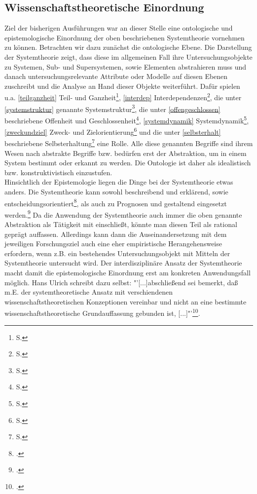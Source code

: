 \documentclass[a4paper,12pt]{article}
\begin{document}
\subsection{Wissenschaftstheoretische Einordnung}\label{einordnung}
Ziel der bisherigen Ausführungen war an dieser Stelle eine ontologische und epistemologische Einordnung der oben beschriebenen Systemtheorie vornehmen zu können. Betrachten wir dazu zunächst die ontologische Ebene. Die Darstellung der Systemtheorie zeigt, dass diese im allgemeinen Fall ihre Untersuchungsobjekte zu Systemen, Sub- und Supersystemen, sowie Elementen abstrahieren muss und danach untersuchungsrelevante Attribute oder Modelle auf diesen Ebenen zuschreibt und die Analyse an Hand dieser Objekte weiterführt. Dafür spielen u.a. \ref{teilganzheit} Teil- und Ganzheit\footnote{S. \pageref{teilganzheit}}, \ref{interdep} Interdependenzen\footnote{S. \pageref{interdep}}, die unter \ref{systemstruktur} genannte Systemstruktur\footnote{S. \pageref{systemstruktur}}, die unter \ref{offengeschlossen} beschriebene Offenheit und Geschlossenheit\footnote{S. \pageref{offengeschlossen}}, \ref{systemdynamik} Systemdynamik\footnote{S. \pageref{systemdynamik}}, \ref{zweckundziel} Zweck- und Zielorientierung\footnote{S. \pageref{zweckundziel}} und die unter \ref{selbsterhalt} beschriebene Selbsterhaltung\footnote{S. \pageref{selbsterhalt}} eine Rolle. Alle diese genannten Begriffe sind ihrem Wesen nach abstrakte Begriffe bzw. bedürfen erst der Abstraktion, um in einem System bestimmt oder erkannt zu werden. Die Ontologie ist daher als idealistisch bzw. konstruktivistisch einzustufen.\\
Hinsichtlich der Epistemologie liegen die Dinge bei der Systemtheorie etwas anders. Die Systemtheorie kann sowohl beschreibend und erklärend, sowie entscheidungsorientiert\footcite[S. 45]{Ulrich2016}, als auch zu Prognosen und gestaltend eingesetzt werden.\footcite[S. 47]{Ulrich2016} Da die Anwendung der Systemtheorie auch immer die oben genannte Abstraktion als Tätigkeit mit einschließt, könnte man diesen Teil als rational geprägt auffassen. Allerdings kann dann die Auseinandersetzung mit dem jeweiligen Forschungsziel auch eine eher empiristische Herangehensweise erfordern, wenn z.B. ein bestehendes Untersuchungsobjekt mit Mitteln der Systemtheorie untersucht wird. Der interdisziplinäre Ansatz der Systemtheorie macht damit die epistemologische Einordnung erst am konkreten Anwendungsfall möglich. Hans Ulrich schreibt dazu selbst: "'[...]abschließend sei bemerkt, daß m.E. der systemtheoretische Ansatz mit verschiendenen wissenschaftstheoretischen Konzeptionen vereinbar und nicht an eine bestimmte wissenschaftstheoretische Grundauffassung gebunden ist, [...]"'\footcite[S. 48]{Ulrich2016}.
\end{document}
